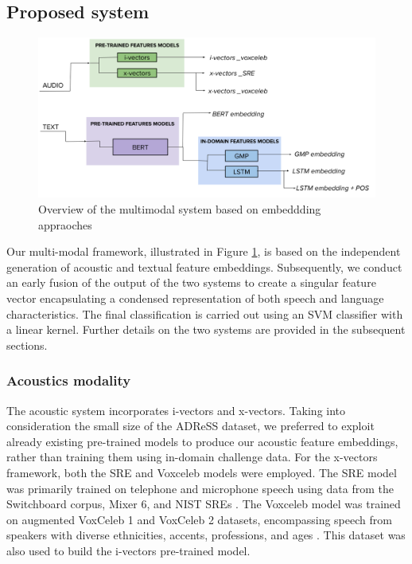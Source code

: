 \subsection{Proposed system}
\begin{figure}
  \begin{center}
  \includegraphics[scale=0.35]{imgs/ADReSS.png}  
  \caption{Overview of the multimodal system based on embeddding appraoches}
  \label{fig:adress_overview}
  \end{center}
\end{figure}
Our multi-modal framework, illustrated in Figure \ref{fig:adress_overview}, is based on the independent generation of acoustic and textual feature embeddings. Subsequently, we conduct an early fusion of the output of the two systems to create a singular feature vector encapsulating a condensed representation of both speech and language characteristics. The final classification is carried out using an \ac{SVM} classifier with a linear kernel. Further details on the two systems are provided in the subsequent sections.
\subsubsection{Acoustics modality}
The acoustic system incorporates i-vectors and x-vectors. Taking into consideration the small size of the ADReSS dataset, we preferred to exploit already existing pre-trained models to produce our acoustic feature embeddings, rather than training them using in-domain challenge data. For the x-vectors framework, both the SRE and Voxceleb models were employed. The SRE model was primarily trained on telephone and microphone speech using data from the Switchboard corpus, Mixer 6, and NIST SREs \cite{snyder2018x}. The Voxceleb model was trained on augmented VoxCeleb 1 and VoxCeleb 2 datasets, encompassing speech from speakers with diverse ethnicities, accents, professions, and ages \cite{snyder2018x,nagrani17_interspeech}. This dataset was also used to build the i-vectors pre-trained model.

